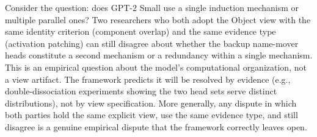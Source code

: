 \documentclass{article}
\begin{document}
Consider the question: does GPT-2 Small use a single induction mechanism or multiple parallel ones?  Two researchers who both adopt the Object view with the same identity criterion (component overlap) and the same evidence type (activation patching) can still disagree about whether the backup name-mover heads constitute a second mechanism or a redundancy within a single mechanism.  This is an empirical question about the model's computational organization, not a view artifact.  The framework predicts it will be resolved by evidence (e.g., double-dissociation experiments showing the two head sets serve distinct distributions), not by view specification.  More generally, any dispute in which both parties hold the same explicit view, use the same evidence type, and still disagree is a genuine empirical dispute that the framework correctly leaves open.
\end{document}

